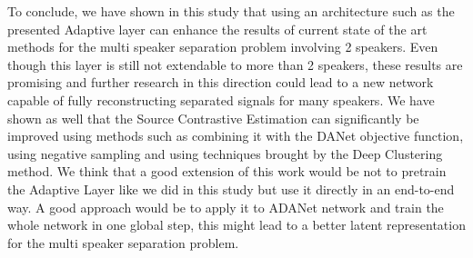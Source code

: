 \documentclass[master,final,11pt]{iscs-thesis}
\begin{document}
To conclude, we have shown in this study that using an architecture such as the presented Adaptive layer can enhance the results of current state of the art methods for the multi speaker separation problem involving 2 speakers. Even though this layer is still not extendable to more than 2 speakers, these results are promising and further research in this direction could lead to a new network capable of fully reconstructing separated signals for many speakers.
We have shown as well that the Source Contrastive Estimation can significantly be improved using methods such as combining it with the DANet objective function, using negative sampling and using techniques brought by the Deep Clustering method.
We think that a good extension of this work would be not to pretrain the Adaptive Layer like we did in this study but use it directly in an end-to-end way. A good approach would be to apply it to ADANet \cite{DANet2} network and train the whole network in one global step, this might lead to a better latent representation for the multi speaker separation problem.





\end{document}
